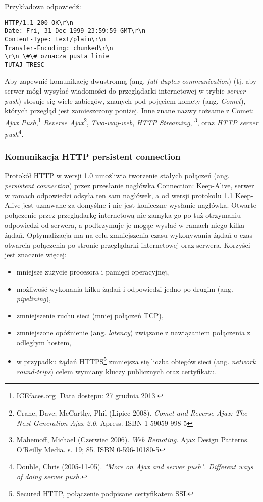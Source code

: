 Przykładowa odpowiedź:
\lstset{language=Octave}
\begin{lstlisting}
HTTP/1.1 200 OK\r\n
Date: Fri, 31 Dec 1999 23:59:59 GMT\r\n
Content-Type: text/plain\r\n
Transfer-Encoding: chunked\r\n
\r\n \#\# oznacza pusta linie
TUTAJ TRESC
\end{lstlisting}

Aby zapewnić komunikację dwustronną (ang. \emph{full-duplex communication}) (tj. aby serwer mógł wysyłać wiadomości do przeglądarki internetowej w trybie \emph{server push}) stosuje się wiele zabiegów, znanych pod pojęciem komety (ang. \emph{Comet}), których przegląd jest zamieszczony poniżej. Inne znane nazwy tożsame z Comet: \emph{Ajax Push},\footnote{ICEfaces.org [Data dostępu: 27 grudnia 2013]} \emph{Reverse Ajax}\footnote{Crane, Dave; McCarthy, Phil (Lipiec 2008). \emph{Comet and Reverse Ajax: The Next Generation Ajax 2.0}. Apress. ISBN 1-59059-998-5}, \emph{Two-way-web}, \emph{HTTP Streaming}, \footnote{Mahemoff, Michael (Czerwiec 2006). \emph{Web Remoting}. Ajax Design Patterns. O'Reilly Media. s. 19; 85. ISBN 0-596-10180-5}, oraz \emph{HTTP server push}\footnote{Double, Chris (2005-11-05). \emph{"More on Ajax and server push". Different ways of doing server push.}}.

\subsubsection{Komunikacja HTTP persistent connection}
\label{subsub:http-persistent-connection}

Protokół HTTP w wersji 1.0 umożliwia tworzenie stałych połączeń (ang. \emph{persistent connection}) przez przesłanie nagłówka Connection: Keep-Alive, serwer w ramach odpowiedzi odsyła ten sam nagłówek, a od wersji protokołu 1.1 Keep-Alive jest uznawane za domyślne i nie jest konieczne wysłanie nagłówka. Otwarte połączenie przez przeglądarkę internetową nie zamyka go po tuż otrzymaniu odpowiedzi od serwera, a podtrzymuje je mogąc wysłać w ramach niego kilka żądań. Optymalizacja ma na celu zmniejszenia czasu wykonywania żądań o czas otwarcia połączenia po stronie przeglądarki internetowej oraz serwera. Korzyści jest znacznie więcej:

\begin{itemize}
	\item mniejsze zużycie procesora i pamięci operacyjnej,
	\item możliwość wykonania kilku żądań i odpowiedzi jedno po drugim (ang. \emph{pipelining}),
	\item zmniejszenie ruchu sieci (mniej połączeń TCP),
	\item zmniejszone opóźnienie (ang. \emph{latency}) związane z nawiązaniem połączenia z odległym hostem,
	\item w przypadku żądań HTTPS\footnote{Secured HTTP, połączenie podpisane certyfikatem SSL} zmniejsza się liczba obiegów sieci (ang. \emph{network round-trips}) celem wymiany kluczy publicznych oraz certyfikatu.
\end{itemize}

